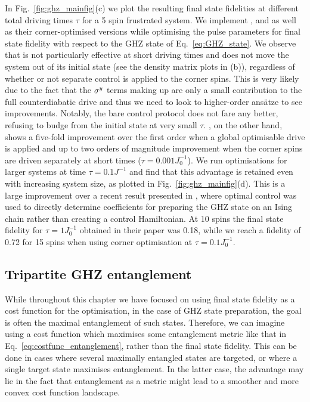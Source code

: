 In Fig.~\ref{fig:ghz_mainfig}(c) we plot the resulting final state fidelities at different total driving times $\tau$ for a 5 spin frustrated system. We implement ,  and   as well as their corner-optimised versions while optimising the pulse parameters for final state fidelity with respect to the GHZ state of Eq.~\eqref{eq:GHZ_state}. We observe that   is not particularly effective at short driving times and does not move the system out of its initial state (see the density matrix plots in (b)), regardless of whether or not separate control is applied to the corner spins. This is very likely due to the fact that the $\sigma^y$ terms making up   are only a small contribution to the full counterdiabatic drive and thus we need to look to higher-order ans\"{a}tze to see improvements. Notably, the bare control protocol  does not fare any better, refusing to budge from the initial state at very small $\tau$.  , on the other hand, shows a five-fold improvement over the first order when a global optimisable drive is applied and up to two orders of magnitude improvement when the corner spins are driven separately at short times ($\tau = 0.001J_0^{-1}$).  We run optimisations for larger systems at time $\tau = 0.1J^{-1}$ and find that this advantage is retained even with increasing system size, as plotted in Fig.~\ref{fig:ghz_mainfig}(d). This is a large improvement over a recent result presented in \cite{sun_optimizing_2022}, where optimal control was used to directly determine   coefficients for preparing the GHZ state on an Ising chain rather than creating a control Hamiltonian. At 10 spins the final state fidelity for $\tau = 1J_0^{-1}$ obtained in their paper was 0.18, while we reach a fidelity of 0.72 for 15 spins when using corner optimisation at $\tau = 0.1J_0^{-1}$. 

\subsection{Tripartite GHZ entanglement}\label{sec:6.4.1_t3}

While throughout this chapter we have focused on using final state fidelity as a cost function for the optimisation, in the case of GHZ state preparation, the goal is often the maximal entanglement of such states. Therefore, we can imagine using a cost function which maximises some entanglement metric like that in Eq.~\eqref{eq:costfunc_entanglement}, rather than the final state fidelity. This can be done in cases where several maximally entangled states are targeted, or where a single target state maximises entanglement. In the latter case, the advantage may lie in the fact that entanglement as a metric might lead to a smoother and more convex cost function landscape.

